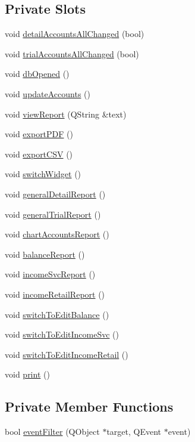 \subsection*{Private Slots}
\begin{CompactItemize}
\item 
void \hyperlink{classReportStack_k0}{detail\-Accounts\-All\-Changed} (bool)
\item 
void \hyperlink{classReportStack_k1}{trial\-Accounts\-All\-Changed} (bool)
\item 
void \hyperlink{classReportStack_k2}{db\-Opened} ()
\item 
void \hyperlink{classReportStack_k3}{update\-Accounts} ()
\item 
void \hyperlink{classReportStack_k4}{view\-Report} (QString \&text)
\item 
void \hyperlink{classReportStack_k5}{export\-PDF} ()
\item 
void \hyperlink{classReportStack_k6}{export\-CSV} ()
\item 
void \hyperlink{classReportStack_k7}{switch\-Widget} ()
\item 
void \hyperlink{classReportStack_k8}{general\-Detail\-Report} ()
\item 
void \hyperlink{classReportStack_k9}{general\-Trial\-Report} ()
\item 
void \hyperlink{classReportStack_k10}{chart\-Accounts\-Report} ()
\item 
void \hyperlink{classReportStack_k11}{balance\-Report} ()
\item 
void \hyperlink{classReportStack_k12}{income\-Svc\-Report} ()
\item 
void \hyperlink{classReportStack_k13}{income\-Retail\-Report} ()
\item 
void \hyperlink{classReportStack_k14}{switch\-To\-Edit\-Balance} ()
\item 
void \hyperlink{classReportStack_k15}{switch\-To\-Edit\-Income\-Svc} ()
\item 
void \hyperlink{classReportStack_k16}{switch\-To\-Edit\-Income\-Retail} ()
\item 
void \hyperlink{classReportStack_k17}{print} ()
\end{CompactItemize}
\subsection*{Private Member Functions}
\begin{CompactItemize}
\item 
bool \hyperlink{classReportStack_d0}{event\-Filter} (QObject $\ast$target, QEvent $\ast$event)
\end{CompactItemize}
